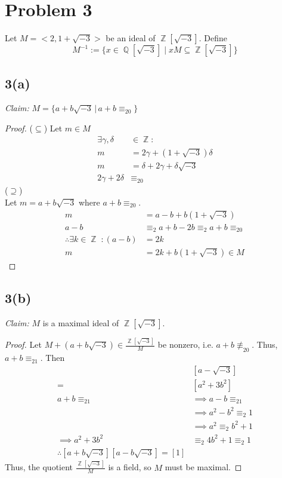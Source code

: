 \documentclass{article}
\DeclareMathOperator{\Z}{\mathbb{Z}}
\DeclareMathOperator{\Q}{\mathbb{Q}}
\begin{document}
\section*{Problem 3}
Let $M=<2,1+\sqrt{-3}>$ be an ideal of $\Z[\sqrt{-3}]$.  Define $$M^{-1}:=\{x\in\Q[\sqrt{-3}]\;\lvert\; xM\subseteq\Z[\sqrt{-3}]\}$$
\subsection*{3(a)}
\textit{Claim:} $M=\{a+b\sqrt{-3}\,|\,a+b\equiv_20\}$
\begin{proof}
	($\subseteq$) Let $m\in M$
	\begin{align*}
	\exists \gamma,\delta&\in\Z:\\
	m&=2\gamma+(1+\sqrt{-3})\delta\\
	m&=\delta+2\gamma+\delta\sqrt{-3}\\
	2\gamma+2\delta&\equiv_20	
	\end{align*}
	($\supseteq$)\\Let $m=a+b\sqrt{-3}$ where $a+b\equiv_20$.  
	\begin{align*}
		m&=a-b+b(1+\sqrt{-3})\\
		a-b&\equiv_2a+b-2b\equiv_2a+b\equiv_20\\\therefore \exists k\in\Z\;:(a-b)&=2k\\
		m&=2k+b(1+\sqrt{-3})\in M
	\end{align*}
\end{proof}
\subsection*{3(b)}
\textit{Claim:} $M$ is a maximal ideal of $\Z[\sqrt{-3}]$.
\begin{proof}
	Let $M+(a+b\sqrt{-3})\in\frac{\Z[\sqrt{-3}]}{M}$ be nonzero, i.e. $a+b\not\equiv_20$.  Thus, $a+b\equiv_21$.  Then
	\begin{align*}
	[a+b\sqrt{-3}]&[a-\sqrt{-3}]\\
	=&[a^2+3b^2]\\
	a+b\equiv_21&\implies a-b\equiv_21\\
	&\implies a^2-b^2\equiv_2 1\\
	&\implies a^2\equiv_2 b^2+1\\
	\implies a^2+3b^2&\equiv_2 4b^2+1\equiv_2 1\\
	\therefore [a+b\sqrt{-3}][a-b\sqrt{-3}]=[1]
	\end{align*}
	Thus, the quotient $\frac{\Z[\sqrt{-3}]}{M}$ is a field, so $M$ must be maximal.
\end{proof}
\end{document}
